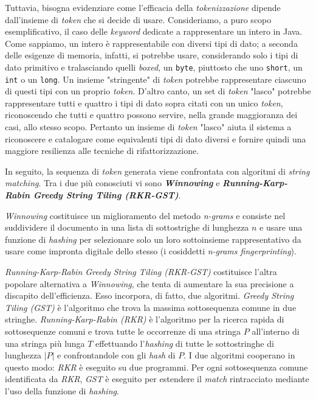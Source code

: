 Tuttavia, bisogna evidenziare come l'efficacia della \textit{tokenizzazione} dipende dall'insieme di \textit{token} che si decide di usare.
%
Consideriamo, a puro scopo esemplificativo, il caso delle \textit{keyword} dedicate a rappresentare un intero in Java.
%
Come sappiamo, un intero è rappresentabile con diversi tipi di dato; a seconda delle esigenze di memoria, infatti, si potrebbe usare, considerando solo i tipi di dato primitivo e tralasciando quelli \textit{boxed}, un \texttt{byte}, piuttosto che uno \texttt{short}, un \texttt{int} o un \texttt{long}. 
%
Un insieme "stringente" di \textit{token} potrebbe rappresentare ciascuno di questi tipi con un proprio \textit{token}.
%
D'altro canto, un set di \textit{token} "lasco" potrebbe rappresentare tutti e quattro i tipi di dato sopra citati con un unico \textit{token}, riconoscendo che tutti e quattro possono servire, nella grande maggioranza dei casi, allo stesso scopo.
%
Pertanto un insieme di \textit{token} "lasco" aiuta il sistema a riconoscere e catalogare come equivalenti tipi di dato diversi e fornire quindi una maggiore resilienza alle tecniche di rifattorizzazione.

In seguito, la sequenza di \textit{token} generata viene confrontata con algoritmi di \textit{string matching}. 
%
Tra i due più conosciuti vi sono \textbf{\textit{Winnowing}} e \textbf{\textit{Running-Karp-Rabin Greedy String Tiling (RKR-GST)}}.

\textit{Winnowing} costituisce un miglioramento del metodo \textit{n-grams} e consiste nel suddividere il documento in una lista di sottostrighe di lunghezza $n$ e  usare una funzione di \textit{hashing} per selezionare solo un loro sottoinsieme rappresentativo da usare come impronta digitale dello stesso (i cosiddetti \textit{n-grams fingerprinting}).

\textit{Running-Karp-Rabin Greedy String Tiling (RKR-GST)} costituisce l'altra popolare alternativa a \textit{Winnowing}, che tenta di aumentare la sua precisione a discapito dell'efficienza. 
%
Esso incorpora, di fatto, due algoritmi.
%
\textit{Greedy String Tiling (GST)} è l'algoritmo che trova la massima sottosequenza comune in due stringhe.
%
\textit{Running-Karp-Rabin (RKR)} è l'algoritmo per la ricerca rapida di sottosequenze comuni e trova tutte le occorrenze di una stringa $P$ all'interno di una stringa più lunga $T$ effettuando l'\textit{hashing} di tutte le sottostringhe di lunghezza $|P|$ e confrontandole con gli \textit{hash} di $P$.
%
I due algoritmi cooperano in questo modo: \textit{RKR} è eseguito su due programmi.
%
Per ogni sottosequenza comune identificata da \textit{RKR}, \textit{GST} è eseguito per estendere il \textit{match} rintracciato mediante l'uso della funzione di \textit{hashing}.

